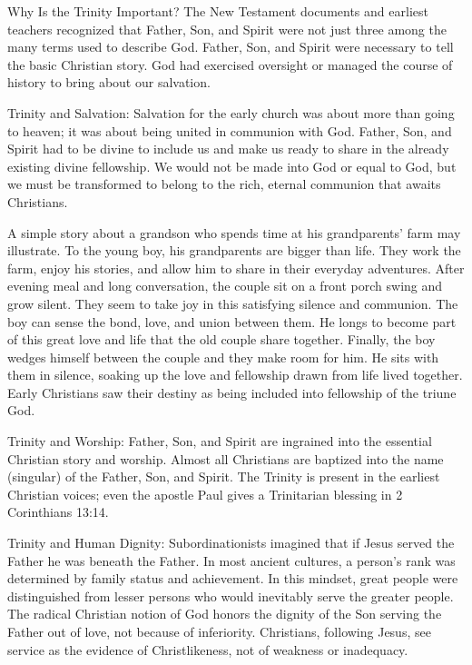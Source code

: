 \begin{sidebar}{Why Is the Trinity Important?}
The New Testament documents and earliest teachers recognized that Father, Son, and Spirit were not
just three among the many terms used to describe God. Father, Son, and Spirit were necessary to tell
the basic Christian story. God had exercised oversight or managed the course of history to bring
about our salvation.

Trinity and Salvation: Salvation for the early church was about more than going to heaven; it was
about being united in communion with God. Father, Son, and Spirit had to be divine to include us and
make us ready to share in the already existing divine fellowship. We would not be made into God or
equal to God, but we must be transformed to belong to the rich, eternal communion that awaits
Christians.

A simple story about a grandson who spends time at his grandparents’ farm may illustrate. To the
young boy, his grandparents are bigger than life. They work the farm, enjoy his stories, and allow
him to share in their everyday adventures. After evening meal and long conversation, the couple sit
on a front porch swing and grow silent. They seem to take joy in this satisfying silence and
communion. The boy can sense the bond, love, and union between them. He longs to become part of this
great love and life that the old couple share together. Finally, the boy wedges himself between the
couple and they make room for him. He sits with them in silence, soaking up the love and fellowship
drawn from life lived together. Early Christians saw their destiny as being included into fellowship
of the triune God.

Trinity and Worship: Father, Son, and Spirit are ingrained into the essential Christian story and
worship. Almost all Christians are baptized into the name (singular) of the Father, Son, and Spirit.
The Trinity is present in the earliest Christian voices; even the apostle Paul gives a Trinitarian
blessing in 2 Corinthians 13:14.

Trinity and Human Dignity: Subordinationists imagined that if Jesus served the Father he was beneath
the Father. In most ancient cultures, a person’s rank was determined by family status and
achievement. In this mindset, great people were distinguished from lesser persons who would
inevitably serve the greater people. The radical Christian notion of God honors the dignity of the
Son serving the Father out of love, not because of inferiority. Christians, following Jesus, see
service as the evidence of Christlikeness, not of weakness or inadequacy.
\end{sidebar}

